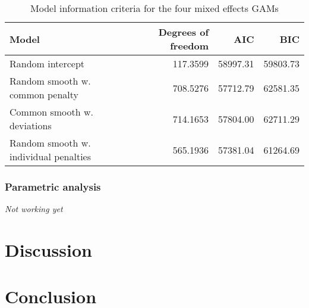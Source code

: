 \documentclass[man, floatsintext]{apa7}
\begin{document}
\begin{table}[htbp]
  \vspace*{2em}
  \begin{threeparttable}
    \caption{Model information criteria for the four mixed effects GAMs}
    \label{tab:ic_tab}
    \begin{tabular}{@{}lrrr@{}} \toprule
      Model                                 & Degrees of freedom & AIC      &
      BIC
      \\ \midrule
      Random intercept                      & 117.3599           & 58997.31 &
      59803.73
      \\
      Random smooth w. common penalty       & 708.5276           & 57712.79 &
      62581.35
      \\
      Common smooth w. deviations           & 714.1653           & 57804.00 &
      62711.29
      \\
      Random smooth w. individual penalties & 565.1936           & 57381.04 &
      61264.69
      \\ \midrule
    \end{tabular}
  \end{threeparttable}
\end{table}

\subsubsection{Parametric analysis}

\textit{Not working yet}

\section{Discussion}

\section{Conclusion}

\printbibliography[]
\end{document}
